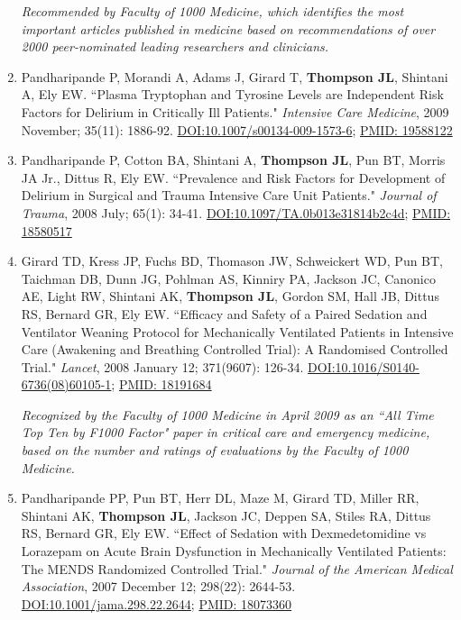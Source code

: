 \documentclass[5pt]{article}
\begin{document}
\begin{enumerate}
    \emph{Recommended by Faculty of 1000 Medicine, which identifies the most important articles published in medicine based on recommendations of over 2000 peer-nominated leading researchers and clinicians.}
\item Pandharipande P, Morandi A, Adams J, Girard T, \textbf{Thompson JL}, Shintani A, Ely EW. ``Plasma Tryptophan and Tyrosine Levels are Independent Risk Factors for Delirium in Critically Ill Patients." \emph{Intensive Care Medicine}, 2009 November; 35(11): 1886-92. \href{https://doi.org/10.1007/s00134-009-1573-6}{DOI:10.1007/s00134-009-1573-6}; \href{https://www.ncbi.nlm.nih.gov/pubmed/19588122}{PMID: 19588122}
\item Pandharipande P, Cotton BA, Shintani A, \textbf{Thompson JL}, Pun BT, Morris JA Jr., Dittus R, Ely EW. ``Prevalence and Risk Factors for Development of Delirium in Surgical and Trauma Intensive Care Unit Patients." \emph{Journal of Trauma}, 2008 July; 65(1): 34-41. \href{https://doi.org/10.1097/TA.0b013e31814b2c4d}{DOI:10.1097/TA.0b013e31814b2c4d}; \href{https://www.ncbi.nlm.nih.gov/pubmed/18580517}{PMID: 18580517}
\item Girard TD, Kress JP, Fuchs BD, Thomason JW, Schweickert WD, Pun BT, Taichman DB, Dunn JG, Pohlman AS, Kinniry PA, Jackson JC, Canonico AE, Light RW, Shintani AK, \textbf{Thompson JL}, Gordon SM, Hall JB, Dittus RS, Bernard GR, Ely EW. ``Efficacy and Safety of a Paired Sedation and Ventilator Weaning Protocol for Mechanically Ventilated Patients in Intensive Care (Awakening and Breathing Controlled Trial): A Randomised Controlled Trial." \emph{Lancet}, 2008 January 12; 371(9607): 126-34. \href{https://doi.org/10.1016/S0140-6736(08)60105-1}{DOI:10.1016/S0140-6736(08)60105-1}; \href{https://www.ncbi.nlm.nih.gov/pubmed/18191684}{PMID: 18191684}

    \emph{Recognized by the Faculty of 1000 Medicine in April 2009 as an ``All Time Top Ten by F1000 Factor" paper in critical care and emergency medicine, based on the number and ratings of evaluations by the Faculty of 1000 Medicine.}
\item Pandharipande PP, Pun BT, Herr DL, Maze M, Girard TD, Miller RR, Shintani AK, \textbf{Thompson JL}, Jackson JC, Deppen SA, Stiles RA, Dittus RS, Bernard GR, Ely EW. ``Effect of Sedation with Dexmedetomidine vs Lorazepam on Acute Brain Dysfunction in Mechanically Ventilated Patients: The MENDS Randomized Controlled Trial." \emph{Journal of the American Medical Association}, 2007 December 12; 298(22): 2644-53. \href{https://doi.org/10.1001/jama.298.22.2644}{DOI:10.1001/jama.298.22.2644}; \href{https://www.ncbi.nlm.nih.gov/pubmed/18073360}{PMID: 18073360}


\end{enumerate}
\end{document}
